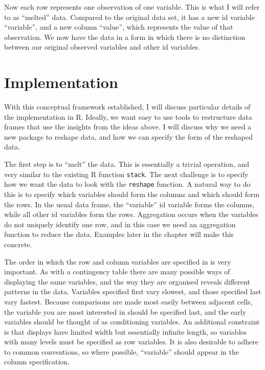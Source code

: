 \documentclass[]{article}
\begin{document}
\bigskip
\noindent Now each row represents one observation of one variable.  This is what I will refer to as ``melted'' data.  Compared to the original data set, it has a new id variable ``variable'', and a new column ``value'', which represents the value of that observation.  We now have the data in a form in which there is no distinction between our original observed variables and other id variables.  

\section{Implementation}

With this conceptual framework established, I will discuss particular details of the implementation in R.  Ideally, we want easy to use tools to restructure data frames that use the insights from the ideas above.  I will discuss why we need a new package to reshape data, and how we can specify the form of the reshaped data.

The first step is to ``melt'' the data.  This is essentially a trivial operation, and very similar to the existing R function \texttt{stack}.  The next challenge is to specify how we want the data to look with the \texttt{reshape} function.  A natural way to do this is to specify which variables should form the columns and which should form the rows.  In the usual data frame, the ``variable'' id variable forms the columns, while all other id variables form the rows.  Aggregation occurs when the variables do not uniquely identify one row, and in this case we need an aggregation function to reduce the data.  Examples later in the chapter will make this concrete.

The order in which the row and column variables are specified in is very important.  As with a contingency table there are many possible ways of displaying the same variables, and the way they are organised reveals different patterns in the data.  Variables specified first vary slowest, and those specified last vary fastest.  Because comparisons are made most easily between adjacent cells, the variable you are most interested in should be specified last, and the early variables should be thought of as conditioning variables.  An additional constraint is that displays have limited width but essentially infinite length, so variables with many levels must be specified as row variables.  It is also desirable to adhere to common conventions, so where possible, ``variable'' should appear in the column specification.
\end{document}
